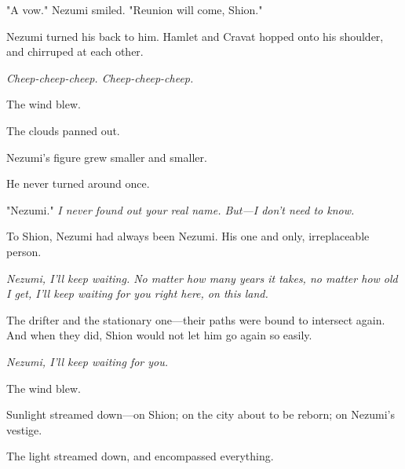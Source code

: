 "A vow." Nezumi smiled. "Reunion will come, Shion."

Nezumi turned his back to him. Hamlet and Cravat hopped onto his
shoulder, and chirruped at each other.

\emph{Cheep-cheep-cheep. Cheep-cheep-cheep.}

The wind blew.

The clouds panned out.

Nezumi's figure grew smaller and smaller.

He never turned around once.

"Nezumi." \emph{I never found out your real name. But---I don't need to know.}

To Shion, Nezumi had always been Nezumi. His one and only, irreplaceable
person.

\emph{Nezumi, I'll keep waiting. No matter how many years it takes, no matter
how old I get, I'll keep waiting for you right here, on this land.}

The drifter and the stationary one---their paths were bound to intersect
again. And when they did, Shion would not let him go again so easily.

\emph{Nezumi, I'll keep waiting for you.}

\myspace

The wind blew.

Sunlight streamed down---on Shion; on the city about to be reborn; on
Nezumi's vestige.

The light streamed down, and encompassed everything.